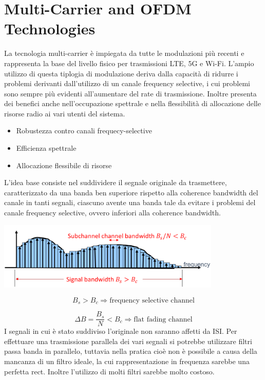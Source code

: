 \section*{Multi-Carrier and OFDM Technologies}






La tecnologia multi-carrier è impiegata da tutte le modulazioni più recenti e rappresenta la base del livello fisico per trasmissioni LTE, 5G e Wi-Fi. 
L'ampio utilizzo di questa tiplogia di modulazione deriva dalla capacità di ridurre i problemi derivanti dall'utilizzo di un canale frequency selective, i cui problemi sono sempre più evidenti all'aumentare del rate di trasmissione. 
Inoltre presenta dei benefici anche nell'occupazione spettrale e nella flessibilità di allocazione delle risorse radio ai vari utenti del sistema.
\begin{itemize}
    \item Robustezza contro canali frequecy-selective
    \item Efficienza spettrale
    \item Allocazione flessibile di risorse
\end{itemize}

L'idea base consiste nel suddividere il segnale originale da trasmettere, caratterizzato da una banda ben superiore rispetto alla coherence bandwidth del canale in tanti segnali,
ciascuno avente una banda tale da evitare i problemi del canale frequency selective, ovvero inferiori alla coherence bandwidth.


\begin{center}
    \includegraphics[width=0.8\textwidth]{imgs/multicarrier.jpg}
\end{center}

\[
  B_s > B_c \Rightarrow \text{frequency selective channel}  
\]

\[
    \Delta B = \frac{B_s}{N} < B_c \Rightarrow \text{flat fading channel}
\]
I segnali in cui è stato suddiviso l'originale non saranno affetti da ISI.
Per effettuare una trasmissione parallela dei vari segnali si potrebbe utilizzare filtri passa banda in parallelo, tuttavia nella pratica cioè non è possibile a causa della mancanza di un filtro ideale, la cui rappresentazione in frequenza sarebbe una perfetta rect. Inoltre l'utilizzo di molti filtri sarebbe molto costoso.


